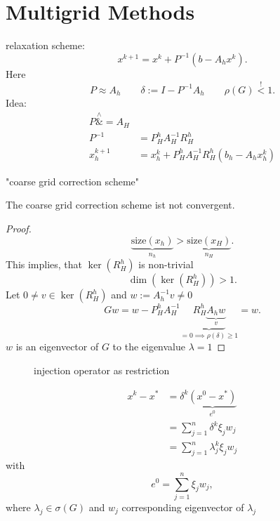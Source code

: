 \chapter{Multigrid Methods}%
\label{cha:Multigrid Methods}

relaxation scheme:
\[
	x^{k+1} = x^{k} + P^{-1}(b-A_{h}x^{k})
.\] 
Here
\[
	P\approx A_{h} \qquad \delta := I-P^{-1}A_{h} \qquad \rho (G) \overset{!}{<} 1 
.\] 
Idea:
\begin{align*}
	P \overset{\wedge}&{=} A_{H} \\
	{P}^{-1} &= P_{H}^{h} {A}^{-1}_{H}R_{H}^{h} \\
	x_{h}^{k+1}&= x_{h}^{k} + P_{H}^{h}A_{H}^{-1}R_{H}^{h}(b_{h} - A_{h}x_{h}^{k})
\end{align*}

"coarse grid correction scheme"

\begin{lemma}
	The coarse grid correction scheme ist not convergent.
\end{lemma}

\begin{proof}
	\[
		\underbrace{\text{size}(x_{h})}_{n_{h}}> \underbrace{\text{size}(x_{H})}_{n_{H}}  
	.\] 
	This implies, that $\ker(R_{H}^{h})$ is non-trivial
	\[
		\dim(\ker(R_{H}^{h})) > 1
	.\] 
	Let $0 \neq v \in \ker(R_{H}^{h})$ and $w:={A}^{-1}_{h}v \neq 0$
	\[
		Gw = w-P_{H}^{h} {A}^{-1}_{H}\underbrace{R_{H}^{h}\underbrace{A_{h}w}_{v} }_{=0 \implies \rho (\delta ) \geq  1} = w
	.\]
	$w$ is an eigenvector of $G$ to the eigenvalue $\lambda =1$
\end{proof}

\begin{figure}[H]
	\begin{center}
	\end{center}
	\caption{injection operator as restriction}
\end{figure}

\begin{align*}
	x^{k}- {x}^{*} &= \delta^{k}\underbrace{(x^{0}- {x}^{*})}_{e^{0}} \\
				   &=\sum_{j=1}^{n}{\delta ^{k}\xi _{j}w_{j}} \\
				   &= \sum_{j=1}^{n}{\lambda ^{k}_{j}\xi _{j}w_{j}}
\end{align*}
with
\[
e^{0} = \sum_{j=1}^{n}{\xi _{j}w_{j}}
,\] 
where $\lambda _{j} \in \sigma (G)$ and $w_{j}$ corresponding eigenvector of $\lambda _{j}$

